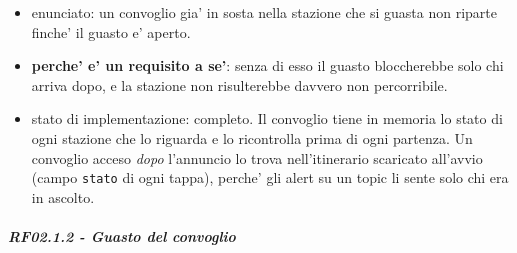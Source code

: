 \documentclass[11pt]{article}
\begin{document}
\begin{enumerate}
\begin{enumerate}
\label{sec:org880fe5c}
\begin{itemize}
\item enunciato: un convoglio gia' in sosta nella stazione che si guasta non riparte finche' il guasto e'
aperto.
\item \textbf{perche' e' un requisito a se'}: senza di esso il guasto bloccherebbe solo chi arriva dopo, e la
stazione non risulterebbe davvero non percorribile.
\item stato di implementazione: completo. Il convoglio tiene in memoria lo stato di ogni stazione che lo
riguarda e lo ricontrolla prima di ogni partenza. Un convoglio acceso \emph{dopo} l'annuncio lo trova
nell'itinerario scaricato all'avvio (campo \texttt{stato} di ogni tappa), perche' gli alert su un topic
li sente solo chi era in ascolto.
\end{itemize}
\end{enumerate}
\end{enumerate}
\subparagraph{RF02.1.2 - Guasto del convoglio}
\label{sec:orge51c4e5}
\end{document}
